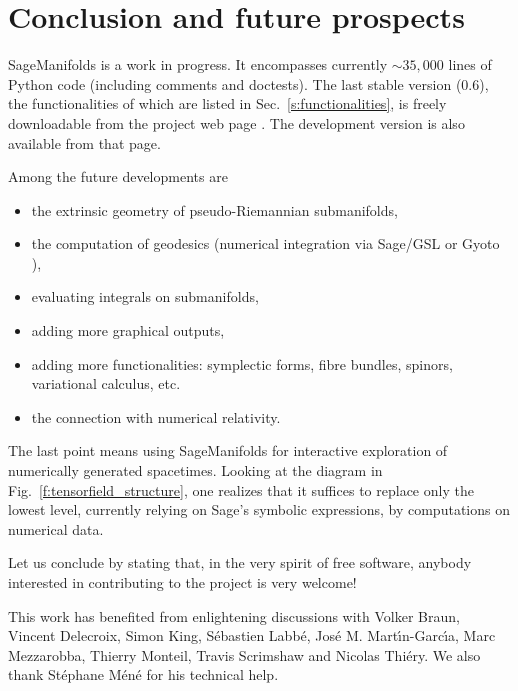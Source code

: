 \documentclass[a4paper]{jpconf}
\newcommand{\soft}[1]{\textsf{#1}}
\newcommand{\Sage}{\soft{Sage}}
\newcommand{\SM}{\soft{SageManifolds}}
\begin{document}

\section{Conclusion and future prospects}

\SM{} is a work in progress. 
It encompasses currently $\sim 35,000$ lines of Python code (including comments and 
doctests). 
The last stable version (0.6), the functionalities of which are 
listed in Sec.~\ref{s:functionalities},
is freely downloadable from the project web page
\cite{SM}. The development version is also available 
from that page.

Among the future developments are 
\begin{itemize}
\item the extrinsic geometry of pseudo-Riemannian submanifolds,
\item the computation of geodesics (numerical integration via \soft{Sage/GSL} or 
\soft{Gyoto} \cite{Gyoto}),
\item evaluating integrals on submanifolds,
\item adding more graphical outputs,
\item adding more functionalities: symplectic forms, fibre bundles, 
spinors, variational calculus, etc.
\item the connection with numerical relativity.
\end{itemize}
The last point means using \SM{} for interactive exploration 
of numerically generated spacetimes. Looking at
the diagram in Fig.~\ref{f:tensorfield_structure}, one realizes that it 
suffices to replace only the lowest level, currently relying on
\Sage{}'s symbolic expressions, by computations on numerical data. 

Let us conclude by stating that, in the very spirit of free software, 
anybody interested in contributing to the project is very welcome!


\ack
This work has benefited from enlightening discussions with Volker Braun,
Vincent Delecroix, Simon King, S\'ebastien Labb\'e, Jos\'e M. Mart\'\i n-Garc\'\i a, 
Marc Mezzarobba, Thierry Monteil, Travis Scrimshaw and Nicolas Thi\'ery. 
We also thank St\'ephane M\'en\'e for his technical help. 
\end{document}
